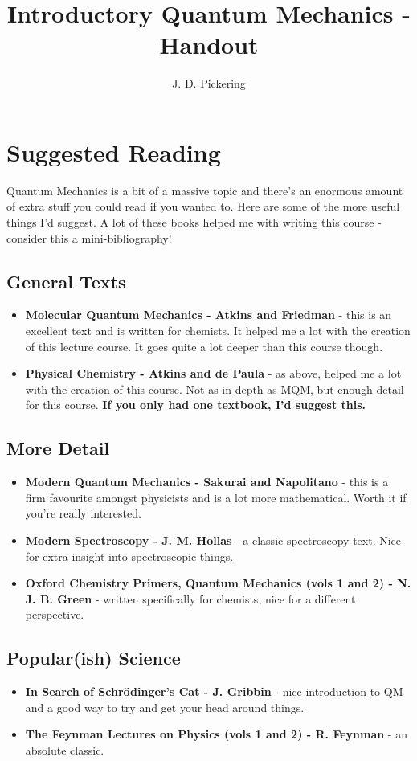\documentclass{memoir}[11pt,oneside,a4paper,openany]
\title{Introductory Quantum Mechanics - Handout}
\author{J. D. Pickering}
\begin{document}
\begin{titlingpage}
\maketitle
\end{titlingpage}
\tableofcontents
\chapter*{Suggested Reading}
Quantum Mechanics is a bit of a massive topic and there's an enormous amount of extra stuff you could read if you wanted to. Here are some of the more useful things I'd suggest. A lot of these books helped me with writing this course - consider this a mini-bibliography!
\section*{General Texts}
\begin{itemize}
	\item \textbf{Molecular Quantum Mechanics - Atkins and Friedman} - this is an excellent text and is written for chemists. It helped me a lot with the creation of this lecture course. It goes quite a lot deeper than this course though.
	\item \textbf{Physical Chemistry - Atkins and de Paula} - as above, helped me a lot with the creation of this course. Not as in depth as MQM, but enough detail for this course. \textbf{If you only had one textbook, I'd suggest this.}
\end{itemize}
\section*{More Detail}
\begin{itemize}
	\item \textbf{Modern Quantum Mechanics - Sakurai and Napolitano} - this is a firm favourite amongst physicists and is a lot more mathematical. Worth it if you're really interested.
	\item \textbf{Modern Spectroscopy - J. M. Hollas} - a classic spectroscopy text. Nice for extra insight into spectroscopic things.
	\item \textbf{Oxford Chemistry Primers, Quantum Mechanics (vols 1 and 2) - N. J. B. Green} - written specifically for chemists, nice for a different perspective.
\end{itemize}
\section*{Popular(ish) Science}
\begin{itemize}
	\item \textbf{In Search of Schr{\"o}dinger's Cat - J. Gribbin} - nice introduction to QM and a good way to try and get your head around things. 
	\item \textbf{The Feynman Lectures on Physics (vols 1 and 2) - R. Feynman} - an absolute classic.
\end{itemize}
\end{document}
